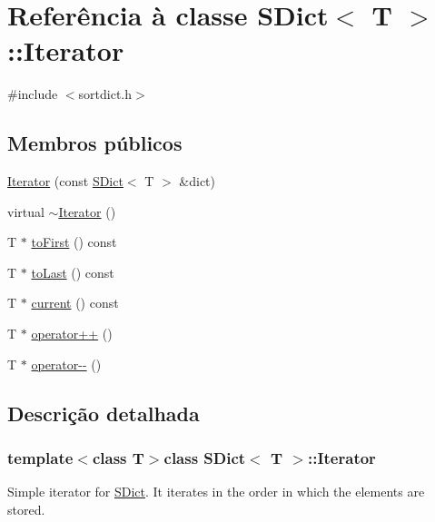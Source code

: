 \hypertarget{class_s_dict_1_1_iterator}{\section{Referência à classe S\-Dict$<$ T $>$\-:\-:Iterator}
\label{class_s_dict_1_1_iterator}
}


{\ttfamily \#include $<$sortdict.\-h$>$}

\subsection*{Membros públicos}
\begin{DoxyCompactItemize}
\item 
\hyperlink{class_s_dict_1_1_iterator_ad287eb9501988e339d0fba2a38637fb7}{Iterator} (const \hyperlink{class_s_dict}{S\-Dict}$<$ T $>$ \&dict)
\item 
virtual \hyperlink{class_s_dict_1_1_iterator_a47b331bac1d130f2bab2c40e76ccb54a}{$\sim$\-Iterator} ()
\item 
T $\ast$ \hyperlink{class_s_dict_1_1_iterator_ade77b001f496006e7017c1ec8620aeb3}{to\-First} () const 
\item 
T $\ast$ \hyperlink{class_s_dict_1_1_iterator_a72d0e5c78c00ed44b21f29f12ae487e0}{to\-Last} () const 
\item 
T $\ast$ \hyperlink{class_s_dict_1_1_iterator_ae616144a9897ce6137bce90597583bab}{current} () const 
\item 
T $\ast$ \hyperlink{class_s_dict_1_1_iterator_a47eb98449264b3d96cf72c29fa3e9049}{operator++} ()
\item 
T $\ast$ \hyperlink{class_s_dict_1_1_iterator_af941a0327bceddd0cbce3539c100d54d}{operator-\/-\/} ()
\end{DoxyCompactItemize}


\subsection{Descrição detalhada}
\subsubsection*{template$<$class T$>$class S\-Dict$<$ T $>$\-::\-Iterator}

Simple iterator for \hyperlink{class_s_dict}{S\-Dict}. It iterates in the order in which the elements are stored. 

